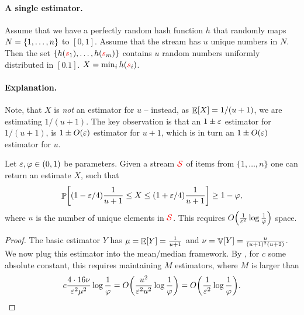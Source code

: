 \paragraph*{A single estimator.}

Assume that we have a perfectly random hash function $h$ that randomly
maps $N = \left\{ {1,\ldots, n} \right\}$ to $[0,1]$. Assume that the stream has
$u$ unique numbers in $N$. Then the set
$\{h({\textcolor{red}{{s}}}_1),\ldots, h({\textcolor{red}{{s}}}_m)\}$ contains $u$ random numbers
uniformly distributed in $[0.1]$. 
$X = \min_i h({\textcolor{red}{{s}}}_i)$.


\paragraph*{Explanation.}
Note, that $X$ is \emph{not} an estimator for $u$ -- instead, as
$\mathop{\mathbb{E}}\!\left[ {X} \right] = 1/(u+1)$, we are estimating $1/(u+1)$. The key observation
is that an $1 \pm {\varepsilon}$ estimator for $1/(u+1)$, is $1 \pm O({\varepsilon})$
estimator for $u+1$, which is in turn an $1 \pm O({\varepsilon})$ estimator for
$u$.



\begin{lemma}
    Let ${\varepsilon}, \varphi \in (0,1)$ be parameters. Given a stream
    ${\textcolor{red}{\mathcal{S}}}$ of items from $\{1,\ldots, n\}$ one can return an estimate
    $X$, such that
    \[
    \Prob{ (1-\eps/4)\frac{1}{u+1} \leq X \leq
       (1+\eps/4)\frac{1}{u+1}} \geq 1-\BadProb,
    \]
    where $u$ is the
    number of unique elements in ${\textcolor{red}{\mathcal{S}}}$. This requires
    $O\pth{ \frac{1 }{\eps^2 } \log \frac{1}{\BadProb}}$ space.
\end{lemma}
\begin{proof}
    The basic estimator $Y$ has $\mu = \mathop{\mathbb{E}}\!\left[ {Y} \right] = \frac{1}{u+1}$ and
    $\nu = \mathop{\mathbb{V}}\!\left[ {Y} \right]=\frac{u}{(u+1)^2 (u+2)}$. We now plug this
    estimator into the mean/median framework. By ,
    for $c$ some absolute constant, this requires maintaining $M$
    estimators, where $M$ is larger than
    \begin{equation*}
        c \frac{4\cdot 16 \nu}{\eps^2 \mu^2 } \log \frac{1}{\BadProb}
        = 
        O\pth{  \frac{u^2 }{\eps^2 u^2 } \log \frac{1}{\BadProb}}
        = 
        O\pth{  \frac{1 }{\eps^2  } \log \frac{1}{\BadProb}}.
    \end{equation*}
\end{proof}

